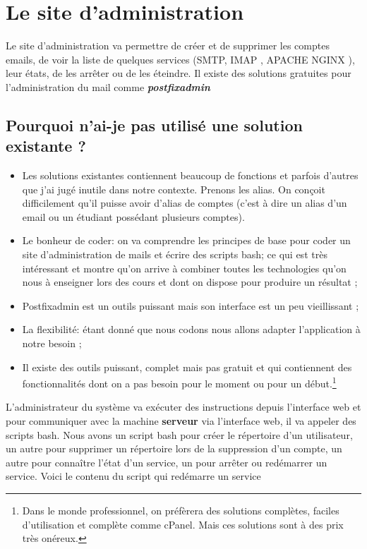 \documentclass[a4paper,12pt,french]{report} %
\begin{document}
\section{Le site d'administration}
Le site d'administration va permettre de créer et de supprimer  les comptes emails, de voir la liste de quelques services (SMTP, IMAP , APACHE NGINX ), leur états,  de les arrêter ou de les éteindre. %
Il existe des solutions gratuites pour l'administration du mail comme \emph{\textbf{postfixadmin}}
\subsection*{Pourquoi n'ai-je pas utilisé une solution existante ?}
\begin{itemize}
\item Les solutions existantes contiennent beaucoup de fonctions et parfois d'autres que j'ai jugé inutile dans notre contexte. Prenons les alias. On conçoit difficilement qu'il puisse avoir d'alias de comptes (c'est à dire un alias d'un email ou un étudiant possédant plusieurs comptes).
\item Le bonheur de coder: on va comprendre les principes de base pour coder un site d'administration de mails et écrire des scripts bash; ce qui est très intéressant et montre qu'on arrive à combiner toutes les technologies qu'on nous à enseigner lors des cours et dont on dispose pour produire un résultat ;
\item Postfixadmin est un outils puissant mais son interface est un peu vieillissant ;
\item  La flexibilité: étant donné que nous codons nous allons adapter l'application à notre besoin ;
\item Il existe des outils puissant, complet mais pas gratuit et qui contiennent des fonctionnalités dont on a pas besoin pour le moment ou pour un début.\footnote{Dans le monde professionnel, on préfèrera des solutions complètes, faciles d'utilisation et complète comme cPanel. Mais ces solutions sont à des prix très onéreux.}
\end{itemize}

L'administrateur du système va exécuter des instructions depuis l'interface web et pour communiquer avec la machine \textbf{serveur} via l'interface web, il va appeler des scripts bash. Nous avons un script bash pour créer le répertoire d'un utilisateur, un autre pour supprimer un répertoire lors de la suppression d'un compte, un autre pour connaître l'état d'un service, un pour arrêter ou redémarrer un service. Voici le contenu du script qui redémarre un service 
\end{document}
